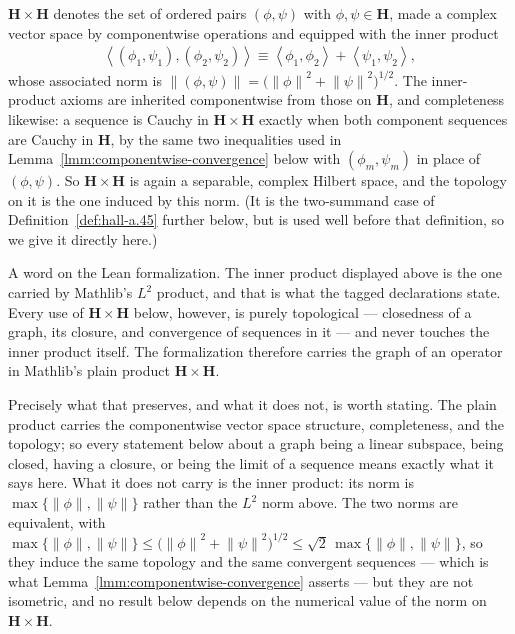 \begin{definition}
    \label{def:product-hilbert-space}
    \leanok
    $\mathbf{H} \times \mathbf{H}$ denotes the set of ordered pairs $(\phi,\psi)$ with $\phi,\psi \in \mathbf{H}$, made a complex vector space by componentwise operations and equipped with the inner product
    \begin{align}
        \left< (\phi_1,\psi_1), (\phi_2,\psi_2) \right> \equiv \left< \phi_1,\phi_2 \right> + \left< \psi_1,\psi_2 \right>,
    \end{align}
    whose associated norm is $\left\| (\phi,\psi) \right\| = \big( \left\| \phi \right\|^2 + \left\| \psi \right\|^2 \big)^{1/2}$. The inner-product axioms are inherited componentwise from those on $\mathbf{H}$, and completeness likewise: a sequence is Cauchy in $\mathbf{H}\times\mathbf{H}$ exactly when both component sequences are Cauchy in $\mathbf{H}$, by the same two inequalities used in Lemma~\ref{lmm:componentwise-convergence} below with $(\phi_m,\psi_m)$ in place of $(\phi,\psi)$. So $\mathbf{H}\times\mathbf{H}$ is again a separable, complex Hilbert space, and the topology on it is the one induced by this norm. (It is the two-summand case of Definition~\ref{def:hall-a.45} further below, but is used well before that definition, so we give it directly here.)

    A word on the Lean formalization. The inner product displayed above is the one carried by Mathlib's $L^2$ product, and that is what the tagged declarations state. Every use of $\mathbf{H}\times\mathbf{H}$ below, however, is purely topological — closedness of a graph, its closure, and convergence of sequences in it — and never touches the inner product itself. The formalization therefore carries the graph of an operator in Mathlib's plain product $\mathbf{H}\times\mathbf{H}$.

    Precisely what that preserves, and what it does not, is worth stating. The plain product carries the componentwise vector space structure, completeness, and the topology; so every statement below about a graph being a linear subspace, being closed, having a closure, or being the limit of a sequence means exactly what it says here. What it does not carry is the inner product: its norm is $\max\{ \left\| \phi \right\|, \left\| \psi \right\| \}$ rather than the $L^2$ norm above. The two norms are equivalent, with $\max\{ \left\| \phi \right\|, \left\| \psi \right\| \} \le \big( \left\| \phi \right\|^2 + \left\| \psi \right\|^2 \big)^{1/2} \le \sqrt{2}\,\max\{ \left\| \phi \right\|, \left\| \psi \right\| \}$, so they induce the same topology and the same convergent sequences — which is what Lemma~\ref{lmm:componentwise-convergence} asserts — but they are not isometric, and no result below depends on the numerical value of the norm on $\mathbf{H}\times\mathbf{H}$.


\end{definition}
